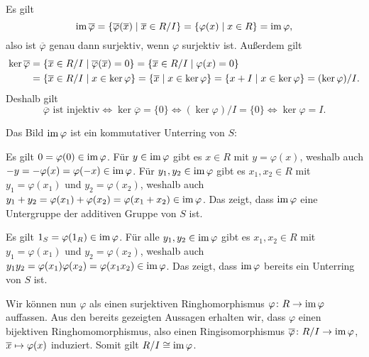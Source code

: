 Es gilt
\[
    \operatorname{im} \overline{\varphi}
  = \{ \overline{\varphi}(\overline{x}) \mid \overline{x} \in R/I \}
  = \{ \varphi(x) \mid x \in R \}
  = \operatorname{im} \varphi,
\]
also ist $\overline{\varphi}$ genau dann surjektiv, wenn $\varphi$ surjektiv ist.
Außerdem gilt
\begin{align*}
      \ker \overline{\varphi}
  &=  \{ \overline{x} \in R/I \mid \overline{\varphi}( \overline{x} ) = 0 \}
   =  \{ \overline{x} \in R/I \mid \varphi(x) = 0 \}
  \\
  &=  \{ \overline{x} \in R/I \mid x \in \ker \varphi \}
   =  \{ \overline{x} \mid x \in \ker \varphi \}
   =  \{ x + I \mid x \in \ker \varphi \}
   =  (\ker \varphi)/I.
\end{align*}
Deshalb gilt
\[
        \text{$\overline{\varphi}$ ist injektiv}
  \iff  \ker \overline{\varphi} = \{0\}
  \iff  (\ker \varphi)/I = \{0\}
  \iff  \ker \varphi = I.
\]

Das Bild $\operatorname{im} \varphi$ ist ein kommutativer Unterring von $S$:

Es gilt $0 = \varphi(0) \in \operatorname{im} \varphi$.
Für $y \in \operatorname{im} \varphi$ gibt es $x \in R$ mit $y = \varphi(x)$, weshalb auch $-y = -\varphi(x) = \varphi(-x) \in \operatorname{im} \varphi$.
Für $y_1, y_2 \in \operatorname{im} \varphi$ gibt es $x_1, x_2 \in R$ mit $y_1 = \varphi(x_1)$ und $y_2 = \varphi(x_2)$, weshalb auch $y_1 + y_2 = \varphi(x_1) + \varphi(x_2) = \varphi(x_1 + x_2) \in \operatorname{im} \varphi$.
Das zeigt, dass $\operatorname{im} \varphi$ eine Untergruppe der additiven Gruppe von $S$ ist.

Es gilt $1_S = \varphi(1_R) \in \operatorname{im} \varphi$.
Für alle $y_1, y_2 \in \operatorname{im} \varphi$ gibt es $x_1, x_2 \in R$ mit $y_1 = \varphi(x_1)$ und $y_2 = \varphi(x_2)$, weshalb auch $y_1 y_2 = \varphi(x_1) \varphi(x_2) = \varphi(x_1 x_2) \in \operatorname{im} \varphi$.
Das zeigt, dass $\operatorname{im} \varphi$ bereits ein Unterring von $S$ ist.

Wir können nun $\varphi$ als einen surjektiven Ringhomorphismus $\varphi \colon R \to \operatorname{im} \varphi$ auffassen.
Aus den bereits gezeigten Aussagen erhalten wir, dass $\varphi$ einen bijektiven Ringhomomorphismus, also einen Ringisomorphismus $\overline{\varphi} \colon R/I \to \operatorname{im} \varphi$, $\overline{x} \mapsto \varphi(x)$ induziert.
Somit gilt $R/I \cong \operatorname{im} \varphi$.









